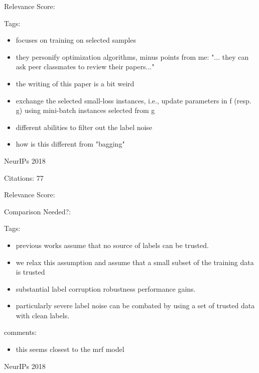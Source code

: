 \documentclass[11pt]{article}
\begin{document}
\noindent Relevance Score:

\noindent Tags:

\begin{itemize}
\item focuses on training on
selected samples
\item they personify optimization algorithms, minus points from me: "... they can ask peer classmates to
review their papers..."
\item the writing of this paper is a bit weird
\item exchange the selected small-loss instances,
i.e., update parameters in f (resp. g) using mini-batch instances selected from g 
\item different
abilities to filter out the label noise
\item how is this different from "bagging"
\end{itemize}

\vspace{2cm}

\noindent NeurIPs 2018

\noindent Citations: 77

\noindent Relevance Score:

\noindent Comparison Needed?: 

\noindent Tags:

\begin{itemize}
\item previous works assume that no source of labels can be trusted. 
\item we relax this assumption and assume that a small subset of the training data is trusted
\item substantial label corruption robustness performance gains.
\item particularly severe label noise can be combated by using a set of trusted data with clean labels.
\end{itemize}

\noindent comments:
\begin{itemize}
\item this seems closest to the mrf model
\end{itemize}

\vspace{2cm}

\noindent NeurIPs 2018
\end{document}
